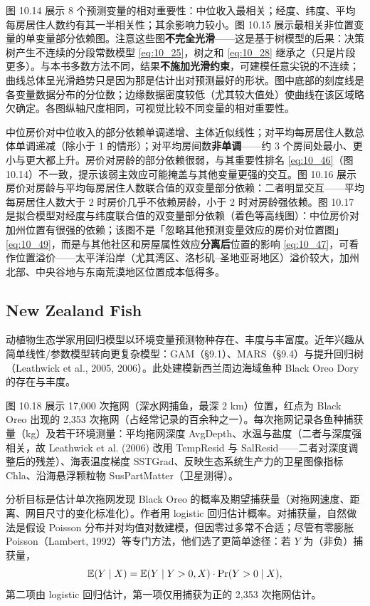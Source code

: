 图 10.14 展示 8 个预测变量的相对重要性：中位收入最相关；经度、纬度、平均每房居住人数约有其一半相关性；其余影响力较小。图 10.15 展示最相关非位置变量的单变量部分依赖图。注意这些图\textbf{不完全光滑}——这是基于树模型的后果：决策树产生不连续的分段常数模型 \eqref{eq:10_25}，树之和 \eqref{eq:10_28} 继承之（只是片段更多）。与本书多数方法不同，结果\textbf{不施加光滑约束}，可建模任意尖锐的不连续；曲线总体呈光滑趋势只是因为那是估计出对预测最好的形状。图中底部的刻度线是各变量数据分布的分位数；边缘数据密度较低（尤其较大值处）使曲线在该区域略欠确定。各图纵轴尺度相同，可视觉比较不同变量的相对重要性。

中位房价对中位收入的部分依赖单调递增、主体近似线性；对平均每房居住人数总体单调递减（除小于 1 的情形）；对平均房间数\textbf{非单调}——约 3 个房间处最小、更小与更大都上升。房价对房龄的部分依赖很弱，与其重要性排名 \eqref{eq:10_46}（图 10.14）不一致，提示该弱主效应可能掩盖与其他变量更强的交互。图 10.16 展示房价对房龄与平均每房居住人数联合值的双变量部分依赖：二者明显交互——平均每房居住人数大于 2 时房价几乎不依赖房龄，小于 2 时对房龄强依赖。图 10.17 是拟合模型对经度与纬度联合值的双变量部分依赖（着色等高线图）：中位房价对加州位置有很强的依赖；该图不是「忽略其他预测变量效应的房价对位置图」\eqref{eq:10_49}，而是与其他社区和房屋属性效应\textbf{分离后}位置的影响 \eqref{eq:10_47}，可看作位置溢价——太平洋沿岸（尤其湾区、洛杉矶–圣地亚哥地区）溢价较大，加州北部、中央谷地与东南荒漠地区位置成本低得多。

\subsection{New Zealand Fish}

动植物生态学家用回归模型以环境变量预测物种存在、丰度与丰富度。近年兴趣从简单线性/参数模型转向更复杂模型：GAM（§9.1）、MARS（§9.4）与提升回归树（Leathwick et al., 2005, 2006）。此处建模新西兰周边海域鱼种 Black Oreo Dory 的存在与丰度。

图 10.18 展示 17,000 次拖网（深水网捕鱼，最深 2 km）位置，红点为 Black Oreo 出现的 2,353 次拖网（占经常记录的百余种之一）。每次拖网记录各鱼种捕获量（kg）及若干环境测量：平均拖网深度 AvgDepth、水温与盐度（二者与深度强相关，故 Leathwick et al. (2006) 改用 TempResid 与 SalResid——二者对深度调整后的残差）、海表温度梯度 SSTGrad、反映生态系统生产力的卫星图像指标 Chla、沿海悬浮颗粒物 SusPartMatter（卫星测得）。

分析目标是估计单次拖网发现 Black Oreo 的概率及期望捕获量（对拖网速度、距离、网目尺寸的变化标准化）。作者用 logistic 回归估计概率。对捕获量，自然做法是假设 Poisson 分布并对均值对数建模，但因零过多常不合适；尽管有零膨胀 Poisson（Lambert, 1992）等专门方法，他们选了更简单途径：若 $Y$ 为（非负）捕获量，
\begin{equation}\label{eq:10_54}
    \mathbb{E}(Y \mid X) = \mathbb{E}(Y \mid Y > 0, X)\cdot \Pr(Y > 0 \mid X),
\end{equation}
第二项由 logistic 回归估计，第一项仅用捕获为正的 2,353 次拖网估计。

